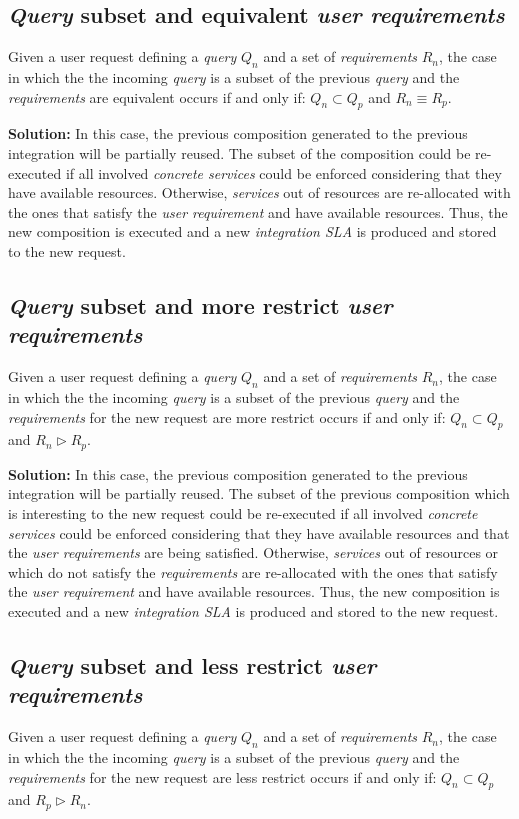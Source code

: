 \subsection{\textsl{Query} subset and equivalent \textsl{user requirements}}
Given a user request defining a \textsl{query} $Q_{n}$ and a set of \textsl{requirements} $R_{n}$, the case in which the the incoming \textsl{query} is a subset of the previous \textsl{query} and the \textsl{requirements} are equivalent occurs if and only if: $Q_{n} \subset Q_{p}$ and $R_{n} \equiv R_{p}$.

\bigskip
\noindent \textbf{Solution:} In this case, the previous composition generated to the previous integration will be partially reused. The subset of the composition could be re-executed if all involved \textsl{concrete services} could be enforced considering that they have available resources. Otherwise, \textsl{services} out of resources are re-allocated with the ones that satisfy the \textsl{user requirement} and have available resources. Thus, the new composition is executed and a new \textsl{integration SLA} is produced and stored to the new request.

\subsection{\textsl{Query} subset and more restrict \textsl{user requirements}}
Given a user request defining a \textsl{query} $Q_{n}$ and a set of \textsl{requirements} $R_{n}$, the case in which the the incoming \textsl{query} is a subset of the previous \textsl{query} and the \textsl{requirements} for the new request are more restrict occurs if and only if: $Q_{n} \subset Q_{p}$ and $R_{n} \triangleright R_{p}$.

\bigskip
\noindent \textbf{Solution:} In this case, the previous composition generated to the previous integration will be partially reused. The subset of the previous composition which is interesting to the new request could be re-executed if all involved \textsl{concrete services} could be enforced considering that they have available resources and that the \textsl{user requirements} are being satisfied. Otherwise, \textsl{services} out of resources or which do not satisfy the \textsl{requirements} are re-allocated with the ones that satisfy the \textsl{user requirement} and have available resources. Thus, the new composition is executed and a new \textsl{integration SLA} is produced and stored to the new request.

\subsection{\textsl{Query} subset and less restrict \textsl{user requirements}}
Given a user request defining a \textsl{query} $Q_{n}$ and a set of \textsl{requirements} $R_{n}$, the case in which the the incoming \textsl{query} is a subset of the previous \textsl{query} and the \textsl{requirements} for the new request are less restrict occurs if and only if: $Q_{n} \subset Q_{p}$ and $R_{p} \triangleright R_{n}$.

